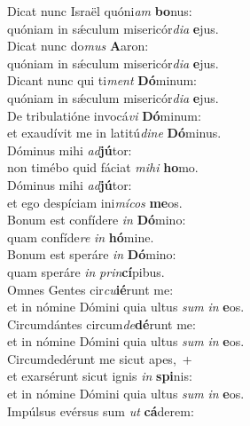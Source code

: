 \evenverse Dicat nunc Israël quóni\textit{am} \textbf{bo}nus:~\*\\
\evenverse quóniam in sǽculum misericór\textit{di}\textit{a} \textbf{e}jus.\\
\oddverse Dicat nunc do\textit{mus} \textbf{A}aron:~\*\\
\oddverse quóniam in sǽculum misericór\textit{di}\textit{a} \textbf{e}jus.\\
\evenverse Dicant nunc qui ti\textit{ment} \textbf{Dó}minum:~\*\\
\evenverse quóniam in sǽculum misericór\textit{di}\textit{a} \textbf{e}jus.\\
\oddverse De tribulatióne invocá\textit{vi} \textbf{Dó}minum:~\*\\
\oddverse et exaudívit me in latitú\textit{di}\textit{ne} \textbf{Dó}minus.\\
\evenverse Dóminus mihi \textit{ad}\textbf{jú}tor:~\*\\
\evenverse non timébo quid fáciat \textit{mi}\textit{hi} \textbf{ho}mo.\\
\oddverse Dóminus mihi \textit{ad}\textbf{jú}tor:~\*\\
\oddverse et ego despíciam ini\textit{mí}\textit{cos} \textbf{me}os.\\
\evenverse Bonum est confídere \textit{in} \textbf{Dó}mino:~\*\\
\evenverse quam confíde\textit{re} \textit{in} \textbf{hó}mine.\\
\oddverse Bonum est speráre \textit{in} \textbf{Dó}mino:~\*\\
\oddverse quam speráre \textit{in} \textit{prin}\textbf{cí}pibus.\\
\evenverse Omnes Gentes cir\textit{cu}\textbf{ié}runt me:~\*\\
\evenverse et in nómine Dómini quia ultus \textit{sum} \textit{in} \textbf{e}os.\\
\oddverse Circumdántes circum\textit{de}\textbf{dé}runt me:~\*\\
\oddverse et in nómine Dómini quia ultus \textit{sum} \textit{in} \textbf{e}os.\\
\evenverse Circumdedérunt me sicut apes,~+\\
\evenverse  et exarsérunt sicut ignis \textit{in} \textbf{spi}nis:~\*\\
\evenverse et in nómine Dómini quia ultus \textit{sum} \textit{in} \textbf{e}os.\\
\oddverse Impúlsus evérsus sum \textit{ut} \textbf{cá}derem:~\*\\
